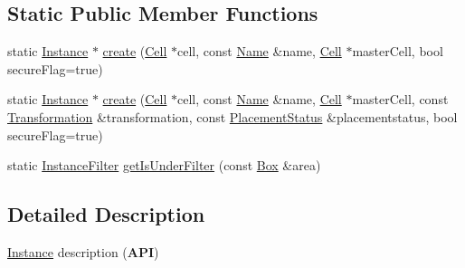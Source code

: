\subsection*{Static Public Member Functions}
\begin{DoxyCompactItemize}
\item 
static \hyperlink{classHurricane_1_1Instance}{Instance} $\ast$ \hyperlink{classHurricane_1_1Instance_ae130b66536e4536ba8852fb79abfb89e}{create} (\hyperlink{classHurricane_1_1Cell}{Cell} $\ast$cell, const \hyperlink{classHurricane_1_1Name}{Name} \&name, \hyperlink{classHurricane_1_1Cell}{Cell} $\ast$master\+Cell, bool secure\+Flag=true)
\item 
static \hyperlink{classHurricane_1_1Instance}{Instance} $\ast$ \hyperlink{classHurricane_1_1Instance_ad5784305151e45c9d949a74bd85aaa36}{create} (\hyperlink{classHurricane_1_1Cell}{Cell} $\ast$cell, const \hyperlink{classHurricane_1_1Name}{Name} \&name, \hyperlink{classHurricane_1_1Cell}{Cell} $\ast$master\+Cell, const \hyperlink{classHurricane_1_1Transformation}{Transformation} \&transformation, const \hyperlink{classHurricane_1_1Instance_1_1PlacementStatus}{Placement\+Status} \&placementstatus, bool secure\+Flag=true)
\item 
static \hyperlink{namespaceHurricane_a889ec1441e1876d9addf89dfab32e772}{Instance\+Filter} \hyperlink{classHurricane_1_1Instance_ae2bc936dfecfaf70a0052959b4b2861e}{get\+Is\+Under\+Filter} (const \hyperlink{classHurricane_1_1Box}{Box} \&area)
\end{DoxyCompactItemize}


\subsection{Detailed Description}
\hyperlink{classHurricane_1_1Instance}{Instance} description ({\bfseries A\+PI}) 

